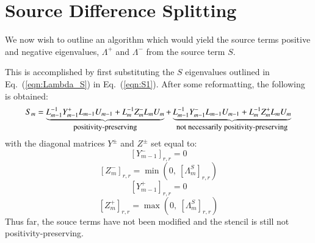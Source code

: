 \documentclass{warpdoc}
\begin{document}
\section{Source Difference Splitting}


We now wish to outline an algorithm which would yield the source terms positive and negative eigenvalues, $\Lambda^+$ and $\Lambda^-$ from the source term $S$.

This is accomplished by first substituting the $S$ eigenvalues outlined in Eq.\ (\ref{eqn:Lambda_S}) in Eq.\  (\ref{eqn:S1}). After some reformatting, the following is obtained:
%
\begin{equation}
S_{m}=
\underbrace{ L^{-1}_{m-1} Y^+_{m-1} L_{m-1} U_{m-1} 
+ L^{-1}_{m} Z^-_{m} L_{m} U_{m}}_\textrm{\small positivity-preserving}
+\underbrace{ L^{-1}_{m-1} Y^-_{m-1} L_{m-1} U_{m-1} 
+ L^{-1}_{m} Z^+_{m} L_{m} U_{m}}_\textrm{\small not~necessarily~positivity-preserving}
\label{eqn:S_split}
\end{equation}
%
with the diagonal matrices $Y^{\pm}$ and $Z^{\pm}$ set equal to: 
%
\begin{equation}
 \left[Y_{m-1}^-\right]_{r,r}  = 0
\label{eqn:Yminus1}
\end{equation}
%
%
\begin{equation}
 \left[Z_{m}^-\right]_{r,r}  = \min\left(0,~\left[ \Lambda_{m}^S\right]_{r,r}\right)
\label{eqn:Zminus1}
\end{equation}
%
%
\begin{equation}
 \left[ Y_{m-1}^+\right]_{r,r}  = 0
\label{eqn:Yplus1}
\end{equation}
%
%
\begin{equation}
 \left[Z_{m}^+\right]_{r,r}  = \max\left(0,~\left[ \Lambda_{m}^S\right]_{r,r}\right)
\label{eqn:Zplus1}
\end{equation}
%
Thus far, the souce terms have not been modified and the stencil is still not positivity-preserving. 
\end{document}
